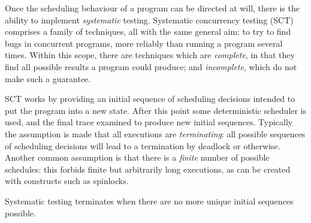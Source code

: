 Once the scheduling behaviour of a program can be directed at will,
there is the ability to implement \emph{systematic}
testing. Systematic concurrency testing (SCT) comprises a family of
techniques, all with the same general aim: to try to find bugs in
concurrent programs, more reliably than running a program several
times. Within this scope, there are techniques which are
\emph{complete}, in that they find all possible results a program
could produce; and \emph{incomplete}, which do not make such a
guarantee.

SCT works by providing an initial sequence of scheduling decisions
intended to put the program into a new state. After this point some
deterministic scheduler is used, and the final trace examined to
produce new initial sequences. Typically the assumption is made that
all executions are \emph{terminating}: all possible sequences of
scheduling decisions will lead to a termination by deadlock or
otherwise. Another common assumption is that there is a \emph{finite}
number of possible schedules: this forbids finite but arbitrarily long
executions, as can be created with constructs such as spinlocks.

Systematic testing terminates when there are no more unique initial
sequences possible.
